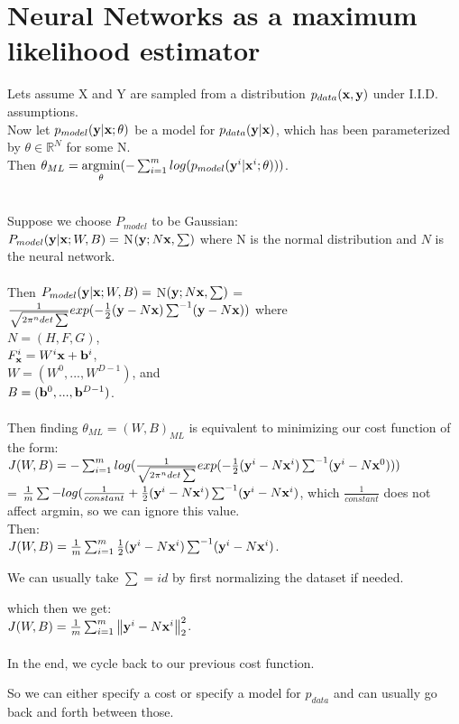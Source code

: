 \section{Neural Networks as a maximum likelihood estimator}
Lets assume X and Y are sampled from a distribution $p_{data}({\vx},{\vy})$ under I.I.D. assumptions.\\
Now let $p_{model}({\vy}|{\vx};\theta)$ be a model for $p_{data}({\vy}|{\vx})$, which has been parameterized by $\theta \in \mathbb{R}^{N}$ for some N.\\
Then $\theta_{ML} = \underset{\theta}{\mathrm{argmin}}(-\sum_{i=1}^{m}log(p_{model}({\vy}^{i}|{\vx}^{i};\theta))) $.\\
\\
\begin{example}
Suppose we choose $P_{model}$ to be Gaussian:\\
$P_{model}({\vy}|{\vx};W,B) =$ N$({\vy};N{\vx},\sum)$ where N is the normal distribution and $N$ is the neural network.\\
\\
Then $P_{model}({\vy}|{\vx};W,B) =$ N$({\vy};N{\vx},\sum)$ = $\frac{1}{\sqrt{2\pi^{n}det\sum}}exp(-\frac{1}{2}({\vy}-N{\vx})\sum^{-1}({\vy}-N{\vx}))$ where\\ $N = (H,F,G)$,\\ $F_{\vx}^{i} = W^{i}{\vx} + {\vb}^{i}$,\\ $W = (W^{0},...,W^{D-1})$, and\\ $B = ({\vb}^{0},...,{\vb}^{D-1})$.\\
\\
Then finding $\theta_{ML} = (W,B)_{ML}$ is equivalent to minimizing our cost function of the form:\\
$J(W,B) = -\sum_{i=1}^{m}log(\frac{1}{\sqrt{2\pi^{n}det\sum}}exp(-\frac{1}{2}({\vy}^{i}-N{\vx}^{i})\sum^{-1}({\vy}^{i}-N{\vx}^{0})))$\\
= $\frac{1}{m}\sum-log(\frac{1}{constant}+\frac{1}{2}({\vy}^{i}-N{\vx}^{i})\sum^{-1}({\vy}^{i}-N{\vx}^{i})$, which $\frac{1}{constant}$ does not affect argmin, so we can ignore this value.\\
Then:\\
$J(W,B) = \frac{1}{m}\sum_{i=1}^{m}\frac{1}{2}({\vy}^{i}-N{\vx}^{i})\sum^{-1}({\vy}^{i}-N{\vx}^{i})$.\\
    \begin{note}
        We can usually take $\sum = id$ by first normalizing the dataset if needed.
    \end{note}
which then we get:\\
$J(W,B) = \frac{1}{m}\sum_{i=1}^{m}\norm{{\vy}^{i}-N{\vx}^{i}}^{2}_{2}$.\\
\\
In the end, we cycle back to our previous cost function.\\
    \begin{note}
        So we can either specify a cost or specify a model for $p_{data}$ and can usually go back and forth between those.
    \end{note}
\end{example}
                     
